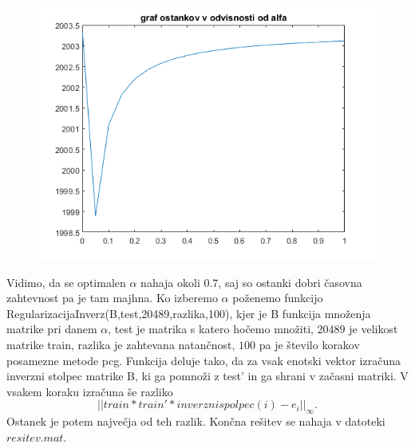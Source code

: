 \documentclass[11pt]{article} %
\begin{document}
\begin{figure}[ht]
\centering
\begin{minipage}{.5\textwidth}
\centering
\includegraphics[scale=0.5]{ostanek}
\end{minipage}%
\end{figure}


Vidimo, da se optimalen $\alpha$ nahaja okoli $0.7$, saj so ostanki dobri časovna zahtevnost pa je tam majhna. Ko izberemo $\alpha$ poženemo funkcijo RegularizacijaInverz(B,test,20489,razlika,100), kjer je B funkcija množenja matrike pri danem $\alpha$, test je matrika s katero hočemo množiti, $20489$ je velikost matrike train, razlika je zahtevana natančnost, $100$ pa je število korakov posamezne metode pcg. Funkcija deluje tako, da za vsak enotski vektor izračuna inverzni stolpec matrike B, ki ga pomnoži z test' in ga shrani v začasni matriki. V vsakem koraku izračuna še razliko
$$||train*train'*inverznispolpec(i) - e_i||_{\infty}.$$
Ostanek je potem največja od teh razlik. Končna rešitev se nahaja v datoteki $resitev.mat$.
\end{document}
